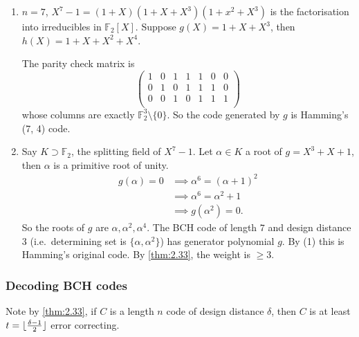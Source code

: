 \documentclass{article}
\DeclarePairedDelimiter{\floor}{\lfloor}{\rfloor}
\newcommand{\F}{\mathbb{F}}
\newcommand{\1}[1]{\mathbbm{1}_{#1}}
\begin{document}
\begin{eg}\leavevmode
    \begin{enumerate}[label=(\arabic*)]
        \item $n = 7$, $X^7 - 1 = (1+X)(1 + X + X^3)(1 + x^2 + X^3)$ is the factorisation into irreducibles in $\F_2[X]$.
            Suppose $g(X) = 1 + X + X^3$, then $h(X) = 1 + X + X^2 + X^4$.

            The parity check matrix is
            \begin{equation*}
                \begin{pmatrix}
                    1 & 0 & 1 & 1 & 1 & 0 & 0 \\
                    0 & 1 & 0 & 1 & 1 & 1 & 0 \\
                    0 & 0 & 1 & 0 & 1 & 1 & 1 \\
                \end{pmatrix}
            \end{equation*}
            whose columns are exactly $\F_2^3 \setminus \{0\}$.
            So the code generated by $g$ is Hamming's (7, 4) code.
        \item Say $K \supset \F_2$, the splitting field of $X^7 - 1$.
            Let $\alpha \in K$ a root of $g = X^3 + X + 1$, then $\alpha$ is a primitive root of unity.
            \begin{align*}
                g(\alpha) = 0 &\implies \alpha^6 = (\alpha+1)^2 \\
                              &\implies \alpha^6 = \alpha^2 + 1 \\
                              &\implies g(\alpha^2) = 0.
            \end{align*}
            So the roots of $g$ are $\alpha, \alpha^2, \alpha^4$.
            The BCH code of length $7$ and design distance $3$ (i.e.\ determining set is $\{\alpha, \alpha^2\}$) has generator polynomial $g$.
            By (1) this is Hamming's original code. By \cref{thm:2.33}, the weight is $\geq 3$.
    \end{enumerate}
\end{eg}
\subsubsection*{Decoding BCH codes}
Note by \cref{thm:2.33}, if $C$ is a length $n$ code of design distance $\delta$, then $C$ is at least $t = \floor{\frac{\delta - 1}{2}}$ error correcting.
\end{document}

